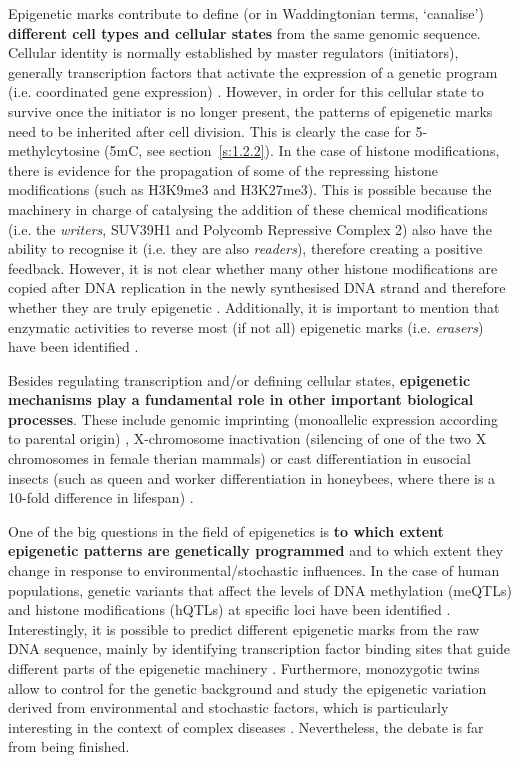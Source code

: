 Epigenetic marks contribute to define (or in Waddingtonian terms, `canalise') \textbf{different cell types and cellular states} from the same genomic sequence. Cellular identity is normally established by master regulators (initiators), generally transcription factors that activate the expression of a genetic program (i.e. coordinated gene expression) \citep{Reinberg2018}. However, in order for this cellular state to survive once the initiator is no longer present, the patterns of epigenetic marks need to be inherited after cell division. This is clearly the case for 5-methylcytosine (\acrshort{5mC}, see section~\ref{s:1.2.2}). In the case of histone modifications, there is evidence for the propagation of some of the repressing histone modifications (such as H3K9me3 and H3K27me3). This is possible because the machinery in charge of catalysing the addition of these chemical modifications (i.e. the \textit{writers}, SUV39H1 and Polycomb Repressive Complex 2) also have the ability to recognise it (i.e. they are also \textit{readers}), therefore creating a positive feedback. However, it is not clear whether many other histone modifications are copied after DNA replication in the newly synthesised DNA strand and therefore whether they are truly epigenetic \citep{Reinberg2018}. Additionally, it is important to mention that enzymatic activities to reverse most (if not all) epigenetic marks (i.e. \textit{erasers}) have been identified \citep{Allis2016}.

\bigskip

Besides regulating transcription and/or defining cellular states, \textbf{epigenetic mechanisms play a fundamental role in other important biological processes}. These include genomic imprinting (monoallelic expression according to parental origin) \citep{Peters2014}, X-chromosome inactivation (silencing of one of the two X chromosomes in female therian mammals) \citep{Wutz2011} or cast differentiation in eusocial insects (such as queen and worker differentiation in honeybees, where there is a 10-fold difference in lifespan) \citep{Patalano2012,Remolina2008}.

\bigskip

One of the big questions in the field of epigenetics is \textbf{to which extent epigenetic patterns are genetically programmed} and to which extent they change in response to environmental/stochastic influences. In the case of human populations, genetic variants that affect the levels of DNA methylation (\acrshort{meQTLs}) and histone modifications (\acrshort{hQTLs}) at specific loci have been identified \citep{Taudt2016}. Interestingly, it is possible to predict different epigenetic marks from the raw DNA sequence, mainly by identifying transcription factor binding sites that guide different parts of the epigenetic machinery \citep{Whitaker2014}. Furthermore, monozygotic twins allow to control for the genetic background and study the epigenetic variation derived from environmental and stochastic factors, which is particularly interesting in the context of complex diseases \citep{Castillo-Fernandez2014}. Nevertheless, the debate is far from being finished.

